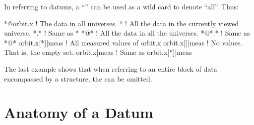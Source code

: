 In referring to datums, a ``\vn{*}'' can be used as a wild card to 
denote ``all''. Thus:
\begin{example}
  *@orbit.x       ! The  data in all universes.
  *               ! All the data in the currently viewed universe.
  *.*             ! Same as *
  *@*             ! All the data in all the universes. 
  *@*.*           ! Same as *@*
  orbit.x[*]|meas ! All measured values of orbit.x
  orbit.x[]|meas  ! No values. That is, the empty set.
  orbit.x|meas    ! Same as orbit.x[*]|meas
\end{example}
The last example shows that when referring to an entire block of data
encompassed by a  structure, the \vn{[*]} can be omitted.

\section{Anatomy of a Datum}
\label{s:data.anatomy}

